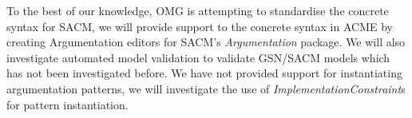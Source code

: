 To the best of our knowledge, OMG is attempting to standardise the concrete syntax for SACM, we will provide support to the concrete syntax in ACME by creating Argumentation editors for SACM's \textit{Argumentation} package. We will also investigate automated model validation to validate GSN/SACM models which has not been investigated before. We have not provided support for instantiating argumentation patterns, we will investigate the use of \textit{ImplementationConstraint}s for pattern instantiation.